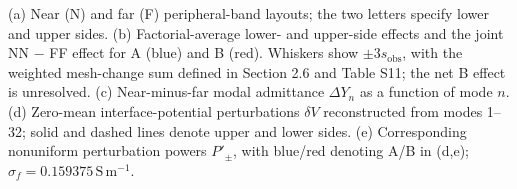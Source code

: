 (a) Near (N) and far (F) peripheral-band layouts; the two letters specify lower and upper sides. (b) Factorial-average lower- and upper-side effects and the joint NN $-$ FF effect for A (blue) and B (red). Whiskers show $\pm3s_{\mathrm{obs}}$, with the weighted mesh-change sum defined in Section 2.6 and Table S11; the net B effect is unresolved. (c) Near-minus-far modal admittance $\Delta Y_n$ as a function of mode $n$. (d) Zero-mean interface-potential perturbations $\delta V$ reconstructed from modes 1--32; solid and dashed lines denote upper and lower sides. (e) Corresponding nonuniform perturbation powers $P'_\pm$, with blue/red denoting A/B in (d,e); $\sigma_f=0.159375\,\mathrm{S\,m^{-1}}$.
